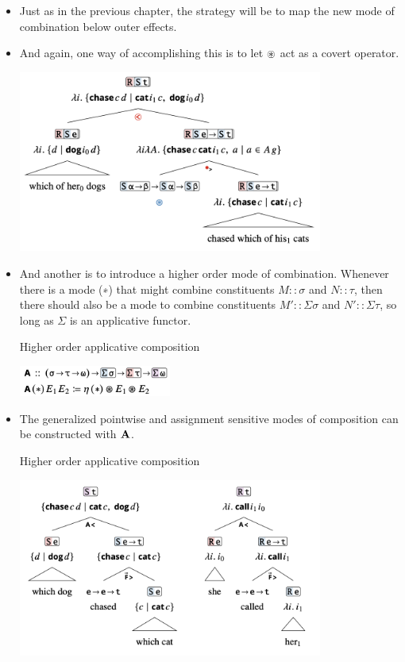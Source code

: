 \documentclass{article}
\begin{document}
\begin{itemize}
  \item Just as in the previous chapter, the strategy will be to map the new mode of combination below outer effects.
  \item And again, one way of accomplishing this is to let $\oast$ act as a covert operator.
    \begin{exe}
      \ex \hfill
        \begin{center}
          \includegraphics[width=10cm]{clips/29.png}
        \end{center}
    \end{exe}
  \item And another is to introduce a higher order mode of combination. Whenever there is a mode (∗) that might combine
  constituents $M :: \sigma$ and $N :: \tau$, then there should also be a mode to combine constituents $M' :: \Sigma\sigma$
  and $N' :: \Sigma\tau$, so long as $\Sigma$ is an applicative functor.
    \begin{exe}
      \ex Higher order applicative composition \hfill
        \begin{center}
          \includegraphics[width=5cm]{clips/30.png}
        \end{center}
    \end{exe}
  \item The generalized pointwise and assignment sensitive modes of composition can be constructed with $\bf A$.
    \begin{exe}
      \ex Higher order applicative composition \hfill
        \begin{center}
          \includegraphics[width=10cm]{clips/31.png}
        \end{center}
    \end{exe}
\end{itemize}
\end{document}
